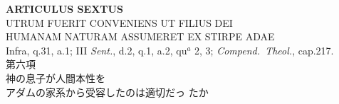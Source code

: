 \documentclass[paper=a4paper,fontsize=10pt,jafontsize=9pt,titlepage]{jlreq}
\begin{document}
{}
\setcounter{section}{6}
\setcounter{subsection}{0}
\begin{center}
 {\Large {\bfseries ARTICULUS SEXTUS}}\\
 {\large UTRUM FUERIT CONVENIENS UT FILIUS DEI \\HUMANAM NATURAM ASSUMERET
 EX STIRPE ADAE}\\
 {\footnotesize Infra, q.31, a.1; III {\itshape Sent.}, d.2, q.1, a.2,
 qu$^a$ 2, 3; {\itshape Compend.~Theol.}, cap.217.}\\
 {\Large 第六項\\神の息子が人間本性を\\アダムの家系から受容したのは適切だっ
 たか}
\end{center}
\end{document}
